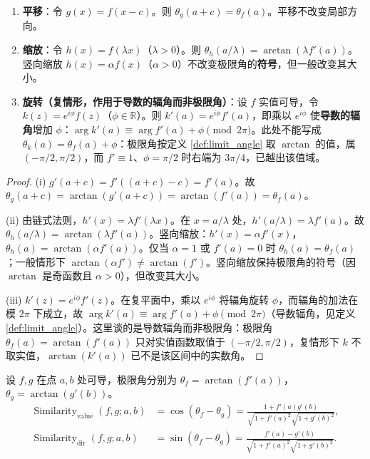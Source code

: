 \begin{proposition}[极限角在三种基本变换下的行为]\label{prop:limit_angle_transformations}
\begin{enumerate}[label=(\roman*)]
    \item \textbf{平移}：令 $g(x) = f(x - c)$。则 $\theta_g(a+c) = \theta_f(a)$。平移不改变局部方向。
    \item \textbf{缩放}：令 $h(x) = f(\lambda x)$（$\lambda > 0$）。则 $\theta_h(a/\lambda) = \arctan(\lambda f'(a))$。竖向缩放 $h(x) = \alpha f(x)$（$\alpha > 0$）不改变极限角的\textbf{符号}，但一般改变其大小。
    \item \textbf{旋转（复情形，作用于导数的辐角而非极限角）}：设 $f$ 实值可导，令 $k(z) = e^{i\phi} f(z)$（$\phi \in \mathbb{R}$）。则 $k'(a) = e^{i\phi} f'(a)$，即乘以 $e^{i\phi}$ 使\textbf{导数的辐角}增加 $\phi$：$\arg k'(a) \equiv \arg f'(a) + \phi \pmod{2\pi}$。此处不能写成 $\theta_k(a) = \theta_f(a) + \phi$：极限角按定义 \ref{def:limit_angle} 取 $\arctan$ 的值，属 $(-\pi/2, \pi/2)$，而 $f'\equiv1$、$\phi = \pi/2$ 时右端为 $3\pi/4$，已越出该值域。
\end{enumerate}
\end{proposition}

\begin{proof}
(i) $g'(a+c) = f'((a+c)-c) = f'(a)$。故 $\theta_g(a+c) = \arctan(g'(a+c)) = \arctan(f'(a)) = \theta_f(a)$。

(ii) 由链式法则，$h'(x) = \lambda f'(\lambda x)$。在 $x = a/\lambda$ 处，$h'(a/\lambda) = \lambda f'(a)$。故 $\theta_h(a/\lambda) = \arctan(\lambda f'(a))$。竖向缩放：$h'(x) = \alpha f'(x)$，$\theta_h(a) = \arctan(\alpha f'(a))$。仅当 $\alpha = 1$ 或 $f'(a) = 0$ 时 $\theta_h(a) = \theta_f(a)$；一般情形下 $\arctan(\alpha f') \neq \arctan(f')$。竖向缩放保持极限角的符号（因 $\arctan$ 是奇函数且 $\alpha > 0$），但改变其大小。

(iii) $k'(z) = e^{i\phi} f'(z)$。在复平面中，乘以 $e^{i\phi}$ 将辐角旋转 $\phi$，而辐角的加法在模 $2\pi$ 下成立，故 $\arg k'(a) \equiv \arg f'(a) + \phi \pmod{2\pi}$（导数辐角，见定义 \ref{def:limit_angle}）。这里谈的是导数辐角而非极限角：极限角 $\theta_f(a) = \arctan(f'(a))$ 只对实值函数取值于 $(-\pi/2, \pi/2)$，复情形下 $k$ 不取实值，$\arctan(k'(a))$ 已不是该区间中的实数角。
\end{proof}

\begin{definition}[微分差相似度]\label{def:diff_similarity}
设 $f, g$ 在点 $a, b$ 处可导，极限角分别为 $\theta_f = \arctan(f'(a))$，$\theta_g = \arctan(g'(b))$。
\begin{align*}
\operatorname{Similarity}_{\text{value}}(f, g; a, b) &= \cos(\theta_f - \theta_g) = \frac{1 + f'(a)g'(b)}{\sqrt{1 + f'(a)^2} \sqrt{1 + g'(b)^2}}, \\
\operatorname{Similarity}_{\text{dir}}(f, g; a, b) &= \sin(\theta_f - \theta_g) = \frac{f'(a) - g'(b)}{\sqrt{1 + f'(a)^2} \sqrt{1 + g'(b)^2}}.
\end{align*}
\end{definition}

